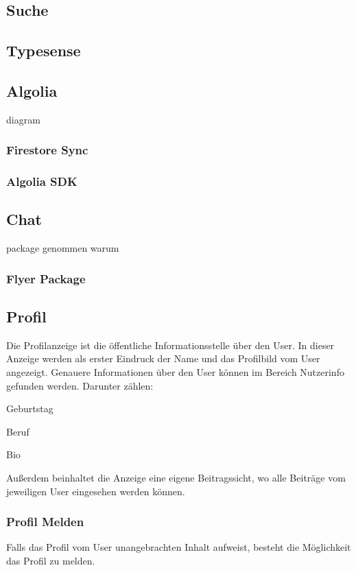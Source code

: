 \subsection{Suche}
\subsection{Typesense}
\subsection{Algolia}
diagram
\subsubsection{Firestore Sync}

\subsubsection{Algolia SDK}


\subsection{Chat}
package genommen warum
\subsubsection{Flyer Package}

\subsection{Profil}
\author{Sandin Habibovic}
Die Profilanzeige ist die öffentliche Informationsstelle über den User. In dieser Anzeige werden als erster Eindruck der Name und das Profilbild vom User angezeigt. Genauere Informationen über den User können im Bereich Nutzerinfo gefunden werden. Darunter zählen:
\begin{compactitem}
  \item Geburtstag
  \item Beruf
  \item Bio
\end{compactitem}
Außerdem beinhaltet die Anzeige eine eigene Beitragssicht, wo alle Beiträge vom jeweiligen User eingesehen werden können.

\subsubsection{Profil Melden}
\author{Sandin Habibovic}
Falls das Profil vom User unangebrachten Inhalt aufweist, besteht die Möglichkeit das Profil zu melden.

